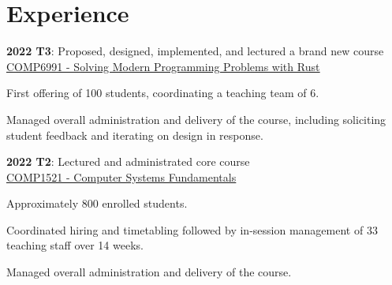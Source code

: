 \documentclass[a4paper]{deedy-resume}
\begin{document}
\begin{minipage}[t]{0.63\textwidth}


\section{Experience}


\vspace{\topsep} %
\begin{tightitemize}
\item
	\textbf{2022 T3}: Proposed, designed, implemented, and lectured
	a brand new course \\
	\href{https://www.handbook.unsw.edu.au/undergraduate/courses/current/COMP6991}
		 {\underline{COMP6991 - Solving Modern Programming Problems with Rust}}
\item First offering of 100 students, coordinating a teaching team of 6.
\item Managed overall administration and delivery of the course,
	  including soliciting student feedback and
	  iterating on design in response.
\item
	\textbf{2022 T2}: Lectured and administrated core course \\
	\href{https://www.handbook.unsw.edu.au/undergraduate/courses/current/COMP1521}
		 {\underline{COMP1521 - Computer Systems Fundamentals}}
\item Approximately 800 enrolled students.
\item Coordinated hiring and timetabling followed by
	  in-session management of 33 teaching staff over 14 weeks.
\item Managed overall administration and delivery of the course.
\end{tightitemize}

\sectionspace




\end{minipage}
\end{document}
